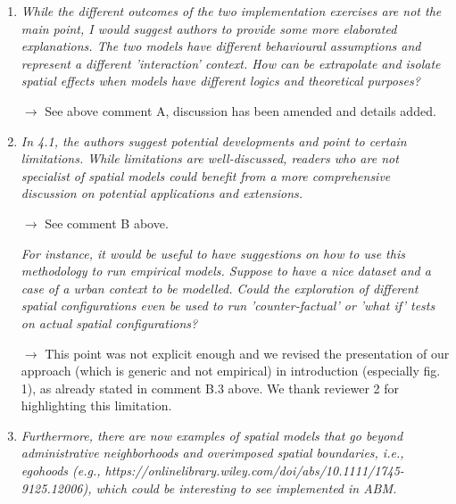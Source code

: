 \documentclass[11pt,a4paper,sans]{moderncv}        %
\begin{document}
\begin{enumerate}

  \item \textit{While the different outcomes of the two implementation exercises are not the main point, I would suggest authors to provide some more elaborated explanations. The two models have different behavioural assumptions and represent a different 'interaction' context. How can be extrapolate and isolate spatial effects when models have different logics and theoretical purposes?}
  
  $\rightarrow$ See above comment A, discussion has been amended and details added.
  \medskip

  \item \textit{In 4.1, the authors suggest potential developments and point to certain limitations. While limitations are well-discussed, readers who are not specialist of spatial models could benefit from a more comprehensive discussion on potential applications and extensions.}
  
  $\rightarrow$ See comment B above.
  
  \medskip
  
  \textit{For instance, it would be useful to have suggestions on how to use this methodology to run empirical models. Suppose to have a nice dataset and a case of a urban context to be modelled. Could the exploration of different spatial configurations even be used to run 'counter-factual' or 'what if' tests on actual spatial configurations?}
  
  $\rightarrow$ This point was not explicit enough and we revised the presentation of our approach (which is generic and not empirical) in introduction (especially fig. 1), as already stated in comment B.3 above. We thank reviewer 2 for highlighting this limitation.
  

  \medskip

  \item \textit{Furthermore, there are now examples of spatial models that go beyond administrative neighborhoods and overimposed spatial boundaries, i.e., egohoods (e.g., https://onlinelibrary.wiley.com/doi/abs/10.1111/1745-9125.12006), which could be interesting to see implemented in ABM.}
  

\end{enumerate}
\end{document}
